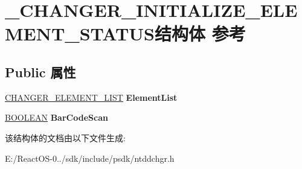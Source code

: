 \hypertarget{struct___c_h_a_n_g_e_r___i_n_i_t_i_a_l_i_z_e___e_l_e_m_e_n_t___s_t_a_t_u_s}{}\section{\+\_\+\+C\+H\+A\+N\+G\+E\+R\+\_\+\+I\+N\+I\+T\+I\+A\+L\+I\+Z\+E\+\_\+\+E\+L\+E\+M\+E\+N\+T\+\_\+\+S\+T\+A\+T\+U\+S结构体 参考}
\label{struct___c_h_a_n_g_e_r___i_n_i_t_i_a_l_i_z_e___e_l_e_m_e_n_t___s_t_a_t_u_s}
\subsection*{Public 属性}
\begin{DoxyCompactItemize}
\item 
\mbox{\label{struct___c_h_a_n_g_e_r___i_n_i_t_i_a_l_i_z_e___e_l_e_m_e_n_t___s_t_a_t_u_s_a1ef5f5bacce02280b08c7592b214d27e}} 
\hyperlink{struct___c_h_a_n_g_e_r___e_l_e_m_e_n_t___l_i_s_t}{C\+H\+A\+N\+G\+E\+R\+\_\+\+E\+L\+E\+M\+E\+N\+T\+\_\+\+L\+I\+ST} {\bfseries Element\+List}
\item 
\mbox{\label{struct___c_h_a_n_g_e_r___i_n_i_t_i_a_l_i_z_e___e_l_e_m_e_n_t___s_t_a_t_u_s_aefb85e4120c2e6e113165a3c1f0493c1}} 
\hyperlink{_processor_bind_8h_a112e3146cb38b6ee95e64d85842e380a}{B\+O\+O\+L\+E\+AN} {\bfseries Bar\+Code\+Scan}
\end{DoxyCompactItemize}


该结构体的文档由以下文件生成\+:\begin{DoxyCompactItemize}
\item 
E\+:/\+React\+O\+S-\/0../sdk/include/psdk/ntddchgr.\+h\end{DoxyCompactItemize}
